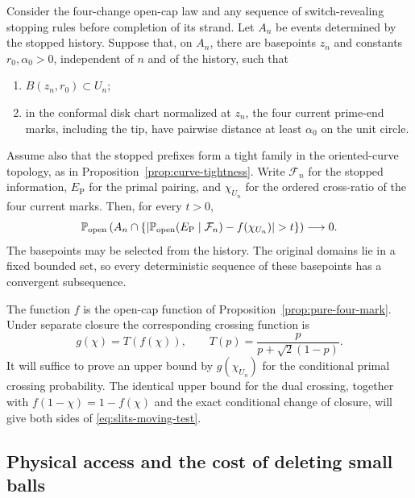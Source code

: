 \begin{proposition}
\label{prop:moving-test}
Consider the four-change open-cap law and any sequence of
switch-revealing stopping rules before completion of its strand.
Let $A_n$ be events determined by the stopped history.  Suppose that,
on $A_n$, there are basepoints $z_n$ and constants $r_0,\alpha_0>0$,
independent of $n$ and of the history, such that
\begin{enumerate}
\item $B(z_n,r_0)\subset U_n$;
\item in the conformal disk chart normalized at $z_n$, the four
  current prime-end marks, including the tip, have pairwise distance
  at least $\alpha_0$ on the unit circle.
\end{enumerate}
Assume also that the stopped prefixes form a tight family in the
oriented-curve topology, as in Proposition~\ref{prop:curve-tightness}.
Write $\mathcal F_n$ for the stopped information, $E_{\mathrm P}$ for
the primal pairing, and $\chi_{U_n}$ for the ordered cross-ratio of
the four current marks.  Then, for every $t>0$,
\begin{equation}\label{eq:slits-moving-test}
 \P_{\mathrm{open}}\left(
 A_n\cap\left\{
 \left|\P_{\mathrm{open}}(E_{\mathrm P}\mid\mathcal F_n)
             -f(\chi_{U_n})\right|>t\right\}\right)\longrightarrow0.
\end{equation}
The basepoints may be selected from the history.  The original domains
lie in a fixed bounded set, so every deterministic sequence of these
basepoints has a convergent subsequence.
\end{proposition}

The function $f$ is the open-cap function of
Proposition~\ref{prop:pure-four-mark}.  Under separate closure the
corresponding crossing function is
\begin{equation}\label{eq:slits-odds}
 g(\chi)=T(f(\chi)),\qquad
 T(p)=\frac{p}{p+\sqrt2(1-p)}.
\end{equation}
It will suffice to prove an upper bound by $g(\chi_{U_n})$ for the
conditional primal crossing probability.  The identical upper bound
for the dual crossing, together with
$f(1-\chi)=1-f(\chi)$ and the exact conditional change of closure,
will give both sides of \eqref{eq:slits-moving-test}.

\subsection{Physical access and the cost of deleting small balls}

